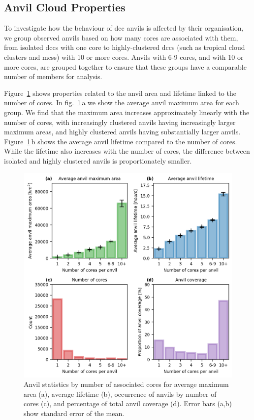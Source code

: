 \subsection{Anvil Cloud Properties}

To investigate how the behaviour of \acrshort{dcc} anvils is affected by their
organisation, we group observed anvils based on how many cores are
associated with them, from isolated \acrshort{dcc}s with one core to
highly-clustered \acrshort{dcc}s (such as tropical cloud clusters and \acrshort{mcs}s) with 10
or more cores. Anvils with 6-9 cores, and with 10 or more cores, are
grouped together to ensure that these groups have a comparable number of
members for analysis.

Figure~\ref{fig:seviri_anvil_stats} shows properties related to the anvil area and lifetime linked
to the number of cores. In fig.~\ref{fig:seviri_anvil_stats}\,a we show the average anvil maximum
area for each group. We find that the maximum area increases
approximately linearly with the number of cores, with increasingly
clustered anvils having increasingly larger maximum areas, and highly
clustered anvils having substantially larger anvils. Figure~\ref{fig:seviri_anvil_stats}\,b shows
the average anvil lifetime compared to the number of cores. While the
lifetime also increases with the number of cores, the difference between
isolated and highly clustered anvils is proportionately smaller.


\begin{figure}[tp]
    \includegraphics[width=\textwidth]{figures/ch3_06.png}
    \caption[
    Anvil statistics by number of associated cores for average maximum area, average lifetime, occurrence of anvils by number of cores, and percentage of total anvil coverage
    ]{
    Anvil statistics by number of associated cores for average maximum area (a), average lifetime (b), occurrence of anvils by number of cores (c), and percentage of total anvil coverage (d). Error bars (a,b) show standard error of the mean.
    }
    \label{fig:seviri_anvil_stats}
\end{figure}


